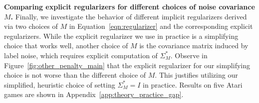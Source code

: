 \textbf{Comparing explicit regularizers for different choices of noise covariance $M$.} Finally, we investigate the behavior of different implicit regularizers derived via two choices of $M$ in Equation~\ref{eqn:regularizer} and the corresponding explicit regularizers. While the explicit regularizer we use in practice is a simplifying choice that works well, another choice of $M$ is the covariance matrix induced by label noise, which requires explicit computation of $\Sigma_M^*$.
Observe in Figure~\ref{fig:other_penalty_main} that the {explicit regularizer for our simplifying choice is not worse than the different choice of $M$}. This justifies utilizing our simplified, heuristic choice of setting $\Sigma_M^* = I$ in practice. Results on five Atari games are shown in Appendix~\ref{app:theory_practice_gap}.       


